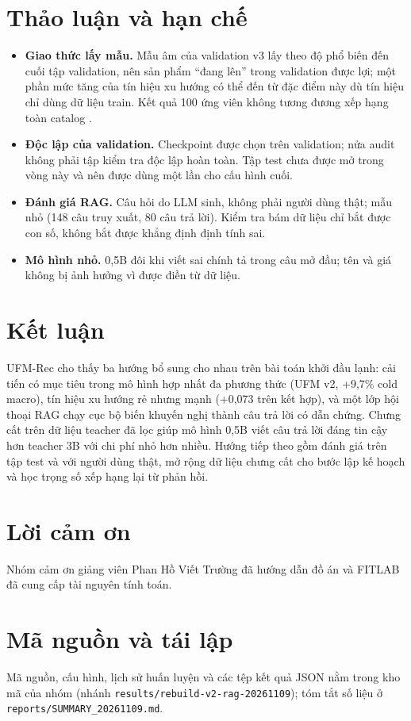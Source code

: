 \documentclass[conference,a4paper]{IEEEtran}
\begin{document}
\section{Thảo luận và hạn chế}
\begin{itemize}
\item \textbf{Giao thức lấy mẫu.} Mẫu âm của validation v3 lấy theo độ phổ biến đến cuối tập validation, nên sản phẩm ``đang lên'' trong validation được lợi; một phần mức tăng của tín hiệu xu hướng có thể đến từ đặc điểm này dù tín hiệu chỉ dùng dữ liệu train. Kết quả 100 ứng viên không tương đương xếp hạng toàn catalog \cite{krichene2020}.
\item \textbf{Độc lập của validation.} Checkpoint được chọn trên validation; nửa audit không phải tập kiểm tra độc lập hoàn toàn. Tập test chưa được mở trong vòng này và nên được dùng một lần cho cấu hình cuối.
\item \textbf{Đánh giá RAG.} Câu hỏi do LLM sinh, không phải người dùng thật; mẫu nhỏ (148 câu truy xuất, 80 câu trả lời). Kiểm tra bám dữ liệu chỉ bắt được con số, không bắt được khẳng định định tính sai.
\item \textbf{Mô hình nhỏ.} 0,5B đôi khi viết sai chính tả trong câu mở đầu; tên và giá không bị ảnh hưởng vì được điền từ dữ liệu.
\end{itemize}

\section{Kết luận}
UFM-Rec cho thấy ba hướng bổ sung cho nhau trên bài toán khởi đầu lạnh: cải tiến có mục tiêu trong mô hình hợp nhất đa phương thức (UFM v2, +9,7\% cold macro), tín hiệu xu hướng rẻ nhưng mạnh (+0,073 trên kết hợp), và một lớp hội thoại RAG chạy cục bộ biến khuyến nghị thành câu trả lời có dẫn chứng. Chưng cất trên dữ liệu teacher đã lọc giúp mô hình 0,5B viết câu trả lời đáng tin cậy hơn teacher 3B với chi phí nhỏ hơn nhiều. Hướng tiếp theo gồm đánh giá trên tập test và với người dùng thật, mở rộng dữ liệu chưng cất cho bước lập kế hoạch và học trọng số xếp hạng lại từ phản hồi.

\section*{Lời cảm ơn}
Nhóm cảm ơn giảng viên Phan Hồ Viết Trường đã hướng dẫn đồ án và FITLAB đã cung cấp tài nguyên tính toán.

\section*{Mã nguồn và tái lập}
Mã nguồn, cấu hình, lịch sử huấn luyện và các tệp kết quả JSON nằm trong kho mã của nhóm (nhánh \texttt{results/rebuild-v2-rag-20261109}); tóm tắt số liệu ở \texttt{reports/SUMMARY\_20261109.md}.
\end{document}
